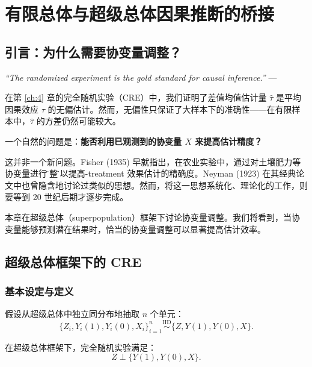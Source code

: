 
\chapter{有限总体与超级总体因果推断的桥接}\label{ch:9}

\section{引言：为什么需要协变量调整？}

\textit{``The randomized experiment is the gold standard for causal inference.''}
--- \citet{Rubin:2005}

在第 \ref{ch:4} 章的完全随机实验（CRE）中，我们证明了差值均值估计量 $\hat{\tau}$ 是平均因果效应 $\tau$ 的无偏估计。然而，无偏性只保证了大样本下的准确性——在有限样本中，$\hat{\tau}$ 的方差仍然可能较大。

一个自然的问题是：\textbf{能否利用已观测到的协变量 $X$ 来提高估计精度？}

这并非一个新问题。Fisher (1935) 早就指出，在农业实验中，通过对土壤肥力等协变量进行\"调整\"可以提高-treatment 效果估计的精确度。Neyman (1923) 在其经典论文中也曾隐含地讨论过类似的思想。然而，将这一思想系统化、理论化的工作，则要等到 20 世纪后期才逐步完成。

本章在超级总体（superpopulation）框架下讨论协变量调整。我们将看到，当协变量能够预测潜在结果时，恰当的协变量调整可以显著提高估计效率。

\section{超级总体框架下的 CRE}\label{sec:9-cre-superpop}

\subsection{基本设定与定义}\label{sec:9-cre-definition}

假设从超级总体中独立同分布地抽取 $n$ 个单元：
\[
\{Z_i, Y_i(1), Y_i(0), X_i\}_{i=1}^n \stackrel{\mathrm{IID}}{\sim} \{Z, Y(1), Y(0), X\}.
\label{eq:9-iid-assumption}
\]

\begin{Definition}\label{def:9-cre-superpop}
在超级总体框架下，完全随机实验满足：
\[
Z \perp \{Y(1), Y(0), X\}.
\label{eq:9-randomization-assumption}
\]
\end{Definition}

